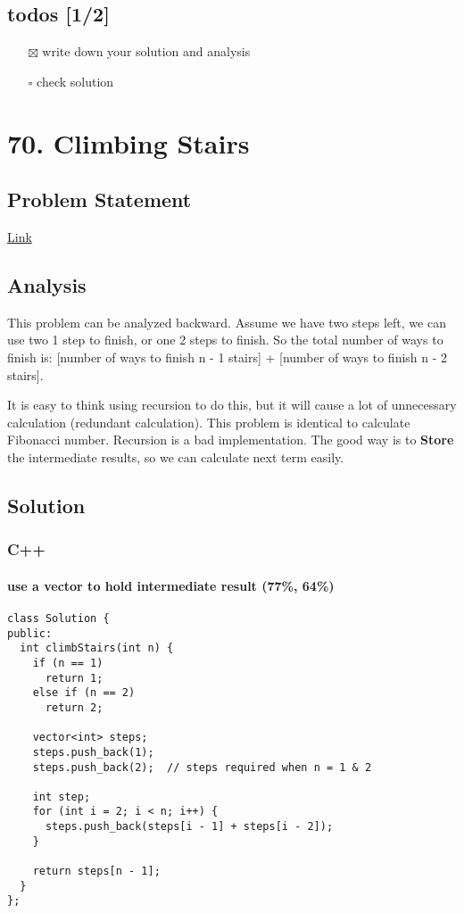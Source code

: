 \documentclass[12pt]{article}
\begin{document}
\subsection{todos [1/2]}
\label{sec:orga78045e}
\begin{itemize}
\item[{$\boxtimes$}] write down your solution and analysis
\item[{$\square$}] check solution
\end{itemize}
\section{70. Climbing Stairs}
\label{sec:org49ec0d0}
\subsection{Problem Statement}
\label{sec:org2022128}
\href{https://leetcode.com/problems/climbing-stairs/}{Link}
\subsection{Analysis}
\label{sec:orgead91ea}
This problem can be analyzed backward. Assume we have two steps left, we can use two 1 step to finish, or one 2 steps to finish. So the total number of ways to finish is: [number of ways to finish n - 1 stairs] + [number of ways to finish n - 2 stairs].

It is easy to think using recursion to do this, but it will cause a lot of unnecessary calculation (redundant calculation). This problem is identical to calculate Fibonacci number. Recursion is a bad implementation. The good way is to \textbf{Store} the intermediate results, so we can calculate next term easily.

\subsection{Solution}
\label{sec:orga60762c}
\subsubsection{C++}
\label{sec:orge8224e2}
\paragraph{use a vector to hold intermediate result (77\%, 64\%)}
\label{sec:org29c5666}
\begin{verbatim}
class Solution {
public:
  int climbStairs(int n) {
    if (n == 1)
      return 1;
    else if (n == 2)
      return 2;

    vector<int> steps;
    steps.push_back(1);
    steps.push_back(2);  // steps required when n = 1 & 2

    int step;
    for (int i = 2; i < n; i++) {
      steps.push_back(steps[i - 1] + steps[i - 2]);
    }

    return steps[n - 1];
  }
};
\end{verbatim}
\end{document}
